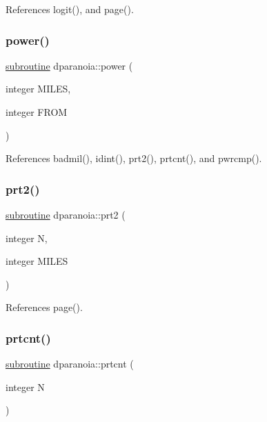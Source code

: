 References logit(), and page().

\mbox{\label{dparanoia_8f90_a908ef801c2dc7c4b54f1a43f007a4dc5}} 
\subsubsection{\texorpdfstring{power()}{power()}}
{\footnotesize\ttfamily \hyperlink{M__stopwatch_83_8txt_acfbcff50169d691ff02d4a123ed70482}{subroutine} dparanoia\+::power (\begin{DoxyParamCaption}\item[{integer}]{M\+I\+L\+ES,  }\item[{integer}]{F\+R\+OM }\end{DoxyParamCaption})}



References badmil(), idint(), prt2(), prtcnt(), and pwrcmp().

\mbox{\label{dparanoia_8f90_adb64903f8562ae9b54e1bc9688d73256}} 
\subsubsection{\texorpdfstring{prt2()}{prt2()}}
{\footnotesize\ttfamily \hyperlink{M__stopwatch_83_8txt_acfbcff50169d691ff02d4a123ed70482}{subroutine} dparanoia\+::prt2 (\begin{DoxyParamCaption}\item[{integer}]{N,  }\item[{integer}]{M\+I\+L\+ES }\end{DoxyParamCaption})}



References page().

\mbox{\label{dparanoia_8f90_a639bf4ff2d08cfba91da58cd02d9ea50}} 
\subsubsection{\texorpdfstring{prtcnt()}{prtcnt()}}
{\footnotesize\ttfamily \hyperlink{M__stopwatch_83_8txt_acfbcff50169d691ff02d4a123ed70482}{subroutine} dparanoia\+::prtcnt (\begin{DoxyParamCaption}\item[{integer}]{N }\end{DoxyParamCaption})}


